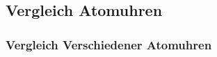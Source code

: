 
\subsection{Vergleich Atomuhren}

\begin{frame}
  \frametitle{Vergleich Verschiedener Atomuhren}
    
\end{frame}





